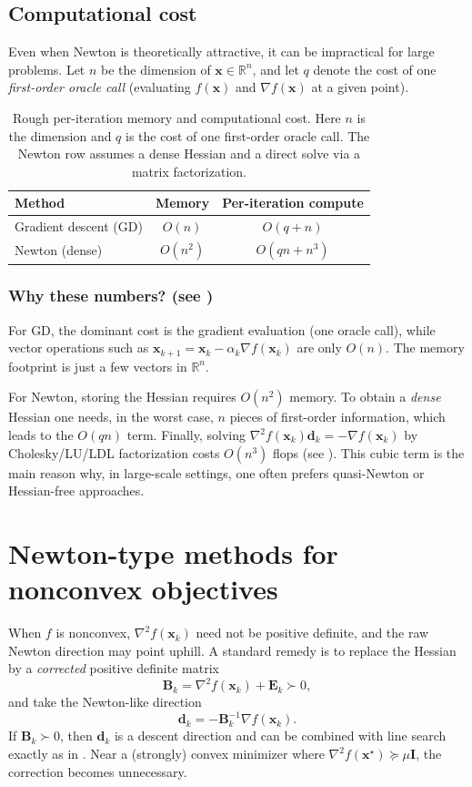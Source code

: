 \subsection{Computational cost}
Even when Newton is theoretically attractive, it can be impractical for large
problems. Let $n$ be the dimension of $\mathbf{x}\in\mathbb{R}^n$, and let $q$
denote the cost of one \emph{first-order oracle call} (evaluating $f(\mathbf{x})$
and $\nabla f(\mathbf{x})$ at a given point).
\begin{table}[ht]
  \centering
  \begin{tabular}{@{}lcc@{}}
    \toprule
    Method & Memory & Per-iteration compute\\
    \midrule
    Gradient descent (GD) & $O(n)$ & $O(q+n)$\\
    Newton (dense) & $O(n^2)$ & $O(qn+n^3)$\\
    \bottomrule
  \end{tabular}
  \caption{Rough per-iteration memory and computational cost. Here $n$ is the
  dimension and $q$ is the cost of one first-order oracle call. The Newton row
  assumes a dense Hessian and a direct solve via a matrix factorization.}
  \label{tab:ch3-cost-gd-newton}
\end{table}

\subsubsection{Why these numbers? (see )}
For GD, the dominant cost is the gradient evaluation (one oracle call), while
vector operations such as $\mathbf{x}_{k+1}=\mathbf{x}_k-\alpha_k\nabla f(\mathbf{x}_k)$
are only $O(n)$. The memory footprint is just a few vectors in $\mathbb{R}^n$.

For Newton, storing the Hessian requires $O(n^2)$ memory.
To obtain a \emph{dense} Hessian one needs, in the worst case, $n$ pieces of
first-order information, which leads to the $O(qn)$ term.
Finally, solving
\(
  \nabla^2 f(\mathbf{x}_k)\mathbf{d}_k=-\nabla f(\mathbf{x}_k)
\)
by Cholesky/LU/LDL factorization costs $O(n^3)$ flops (see
). This cubic term is the main reason why, in
large-scale settings, one often prefers quasi-Newton or Hessian-free
approaches.

\section{Newton-type methods for nonconvex objectives}
\label{sec:ch3-hessian-corrections}
When $f$ is nonconvex, $\nabla^2 f(\mathbf{x}_k)$ need not be positive definite,
and the raw Newton direction may point uphill. A standard remedy is to replace the Hessian
by a \emph{corrected} positive definite matrix
\[
  \mathbf{B}_k = \nabla^2 f(\mathbf{x}_k)+\mathbf{E}_k \succ 0,
\]
and take the Newton-like direction
\[
  \mathbf{d}_k=-\mathbf{B}_k^{-1}\nabla f(\mathbf{x}_k).
\]
If $\mathbf{B}_k\succ 0$, then $\mathbf{d}_k$ is a descent direction and can be
combined with line search exactly as in .
Near a (strongly) convex minimizer where $\nabla^2 f(\mathbf{x}^\star)\succeq \mu\mathbf{I}$,
the correction becomes unnecessary.

